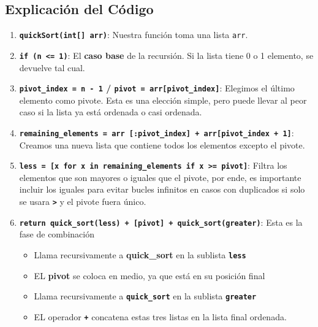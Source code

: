 \documentclass[
  spanish,
  letterpaper,
  DIV=11,
  numbers=noendperiod]{scrreprt}
\providecommand{\tightlist}{%
  \setlength{\itemsep}{0pt}\setlength{\parskip}{0pt}}
\begin{document}
\subsection{Explicación del
Código}\label{explicaciuxf3n-del-cuxf3digo-1}

\begin{enumerate}
\def\labelenumi{\arabic{enumi}.}
\tightlist
\item
  \textbf{\texttt{quickSort(int{[}{]}\ arr)}}: Nuestra función toma una
  lista \texttt{arr}.
\item
  \textbf{\texttt{if\ (n\ \textless{}=\ 1)}}: El \textbf{caso base} de
  la recursión. Si la lista tiene 0 o 1 elemento, se devuelve tal cual.
\item
  \textbf{\texttt{pivot\_index\ =\ n\ -\ 1} /
  \texttt{pivot\ =\ arr{[}pivot\_index{]}}}: Elegimos el último elemento
  como pivote. Esta es una elección simple, pero puede llevar al peor
  caso si la lista ya está ordenada o casi ordenada.
\item
  \textbf{\texttt{remaining\_elements\ =\ arr\ {[}:pivot\_index{]}\ +\ arr{[}pivot\_index\ +\ 1{]}}}:
  Creamos una nueva lista que contiene todos los elementos excepto el
  pivote.
\item
  \textbf{\texttt{less\ =\ {[}x\ for\ x\ in\ remaining\_elements\ if\ x\ \textgreater{}=\ pivot{]}}}:
  Filtra los elementos que son mayores o iguales que el pivote, por
  ende, es importante incluir los iguales para evitar bucles infinitos
  en casos con duplicados si solo se usara
  \textbf{\texttt{\textgreater{}}} y el pivote fuera único.
\item
  \textbf{\texttt{return\ quick\_sort(less)\ +\ {[}pivot{]}\ +\ quick\_sort(greater)}}:
  Esta es la fase de combinación

  \begin{itemize}
  \tightlist
  \item
    Llama recursivamente a \textbf{quick\_sort} en la sublista
    \textbf{\texttt{less}}
  \item
    EL \textbf{pivot} se coloca en medio, ya que está en su posición
    final
  \item
    Llama recursivamente a \textbf{\texttt{quick\_sort}} en la sublista
    \textbf{\texttt{greater}}
  \item
    EL operador \textbf{\texttt{+}} concatena estas tres listas en la
    lista final ordenada.
  \end{itemize}
\end{enumerate}
\end{document}
